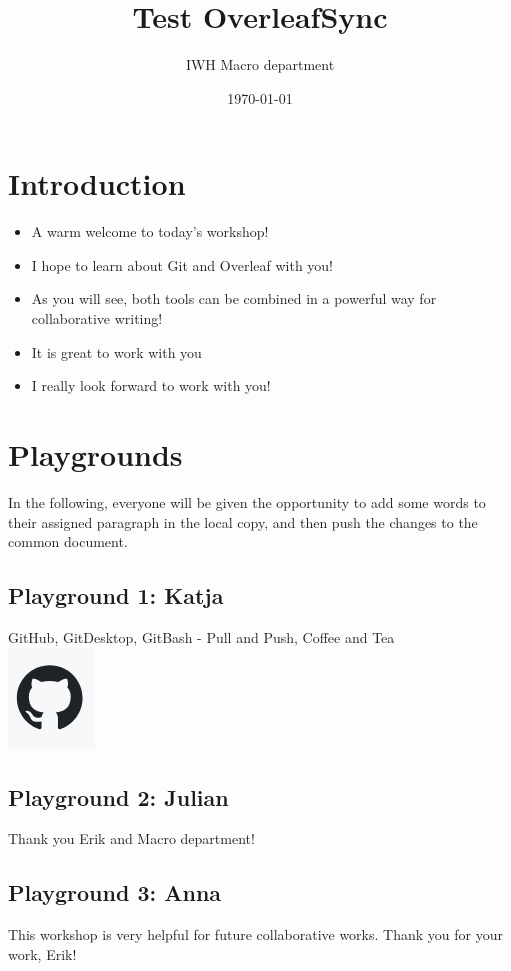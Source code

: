 \documentclass{article}
\title{Test OverleafSync}
\author{IWH Macro department}
\date{\today}
\begin{document}
\maketitle

\section{Introduction}

\begin{itemize} 
    \item A warm welcome to today's workshop!
    \item I hope to learn about Git and Overleaf with you!
    \item As you will see, both tools can be combined in a powerful way for collaborative writing!
    \item It is great to work with you
    \item I really look forward to work with you!
\end{itemize}

\section{Playgrounds}
In the following, everyone will be given the opportunity to add some words to their assigned paragraph in the local copy, and then push the changes to the common document.

\subsection{Playground 1: Katja}
GitHub, GitDesktop, GitBash - Pull and Push, Coffee and Tea
\\
\includegraphics[Test Figure]{Figures/Overleaf.PNG}

\subsection{Playground 2: Julian}
Thank you Erik and Macro department!

\subsection{Playground 3: Anna}
This workshop is very helpful for future collaborative works. Thank you for your work, Erik!
\end{document}
